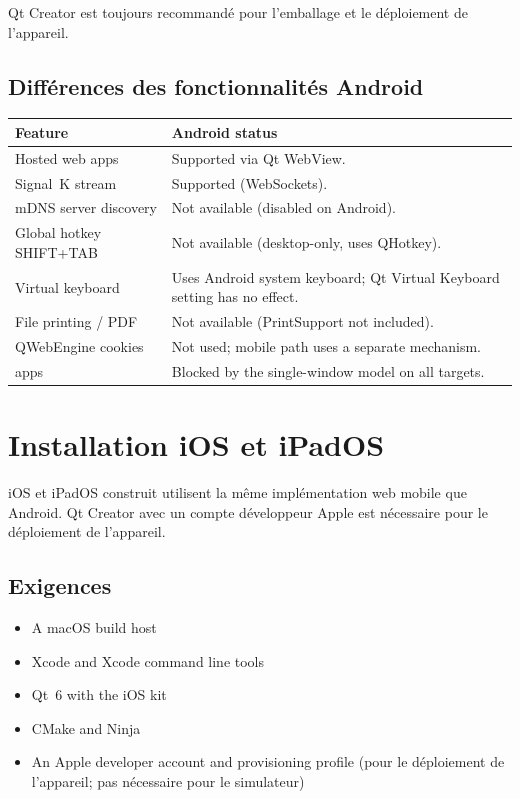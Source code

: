 Qt Creator est toujours recommandé pour l'emballage et le déploiement de l'appareil.

\subsection{Différences des fonctionnalités Android}

\begin{longtable}{L{5.2cm}L{8.5cm}}
\toprule
{}
\color{white}\sffamily\bfseries Feature &
\color{white}\sffamily\bfseries Android status \\
\midrule
Hosted web apps          & Supported via Qt WebView. \\
Signal~K stream          & Supported (WebSockets). \\
mDNS server discovery    & Not available (disabled on Android). \\
Global hotkey SHIFT+TAB  & Not available (desktop-only, uses QHotkey). \\
Virtual keyboard         & Uses Android system keyboard; Qt Virtual Keyboard setting has no effect. \\
File printing / PDF      & Not available (PrintSupport not included). \\
QWebEngine cookies       & Not used; mobile path uses a separate mechanism. \\
 apps      & Blocked by the single-window model on all targets. \\
\bottomrule
\end{longtable}

\section{Installation iOS et iPadOS}
\label{app:ios}

iOS et iPadOS construit utilisent la même implémentation web mobile que Android.
Qt Creator avec un compte développeur Apple est nécessaire pour le déploiement de l'appareil.

\subsection{Exigences}

\begin{itemize}
  \item A macOS build host
  \item Xcode and Xcode command line tools
  \item Qt~6 with the iOS kit
  \item CMake and Ninja
  \item An Apple developer account and provisioning profile
(pour le déploiement de l'appareil; pas nécessaire pour le simulateur)
\end{itemize}

